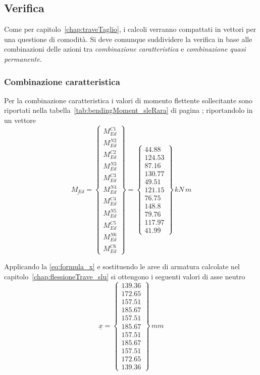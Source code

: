 \subsection{Verifica}
Come per capitolo~\ref{chap:traveTaglio}, i calcoli verranno compattati in vettori per una questione di comodità. Si deve comunque suddividere la verifica in base alle combinazioni delle azioni tra \textit{combinazione caratteristica} e \textit{combinazione quasi permanente}.

\subsubsection*{Combinazione caratteristica}
Per la combinazione caratteristica i valori di momento flettente sollecitante sono riportati nella tabella~\ref{tab:bendingMoment_sleRara} di pagina \pageref{tab:bendingMoment_sleRara}; riportandolo in un vettore
\[
\underline{M_{Ed}} = 
\begin{Bmatrix}
	M_{Ed}^{C1}\\
	M_{Ed}^{N2}\\
	M_{Ed}^{C2}\\
	M_{Ed}^{N3}\\
	M_{Ed}^{C3}\\
	M_{Ed}^{N4}\\
	M_{Ed}^{C4}\\
	M_{Ed}^{N5}\\
	M_{Ed}^{C5}\\
	M_{Ed}^{N6}\\
	M_{Ed}^{C6}
\end{Bmatrix} = 
\begin{Bmatrix}
	44.88\\
	124.53\\
	87.16\\
	130.77\\
	49.51\\
	121.15\\
	76.75\\
	148.8\\
	79.76\\
	117.97\\
	41.99
\end{Bmatrix}\,kN\,m
\]

Applicando la \eqref{eq:formula_x} e sostituendo le aree di armatura calcolate nel capitolo~\ref{chap:flessioneTrave_slu} si ottengono i seguenti valori di asse neutro
\[
\underline{x} = 
\begin{Bmatrix}
	139.36\\172.65\\157.51\\185.67\\157.51\\185.67\\157.51\\185.67\\157.51\\172.65\\139.36
\end{Bmatrix}\,mm
\]

